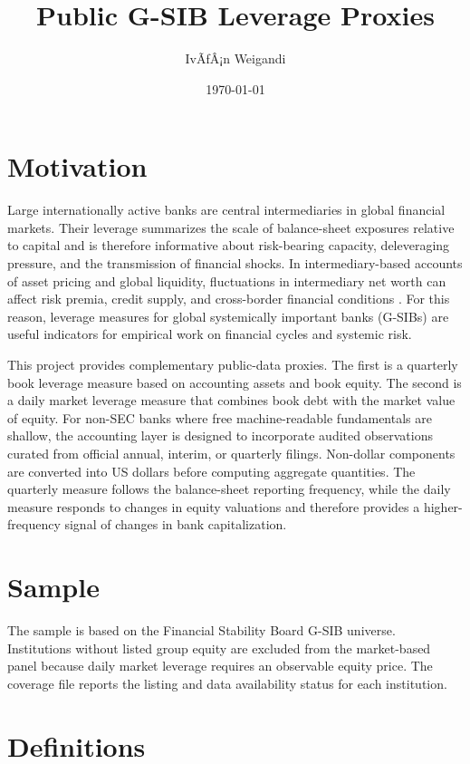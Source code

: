 \documentclass[11pt]{article}
\title{Public G-SIB Leverage Proxies}
\author{IvÃƒÂ¡n Weigandi}
\date{\today}
\begin{document}
\maketitle

\section{Motivation}

Large internationally active banks are central intermediaries in global financial markets. Their leverage summarizes the scale of balance-sheet exposures relative to capital and is therefore informative about risk-bearing capacity, deleveraging pressure, and the transmission of financial shocks. In intermediary-based accounts of asset pricing and global liquidity, fluctuations in intermediary net worth can affect risk premia, credit supply, and cross-border financial conditions \citep{adrianshin2010,hekrishnamurthy2013,brunnermeierpedersen2009}. For this reason, leverage measures for global systemically important banks (G-SIBs) are useful indicators for empirical work on financial cycles and systemic risk.

This project provides complementary public-data proxies. The first is a quarterly book leverage measure based on accounting assets and book equity. The second is a daily market leverage measure that combines book debt with the market value of equity. For non-SEC banks where free machine-readable fundamentals are shallow, the accounting layer is designed to incorporate audited observations curated from official annual, interim, or quarterly filings. Non-dollar components are converted into US dollars before computing aggregate quantities. The quarterly measure follows the balance-sheet reporting frequency, while the daily measure responds to changes in equity valuations and therefore provides a higher-frequency signal of changes in bank capitalization.

\section{Sample}

The sample is based on the Financial Stability Board G-SIB universe. Institutions without listed group equity are excluded from the market-based panel because daily market leverage requires an observable equity price. The coverage file reports the listing and data availability status for each institution.

\section{Definitions}
\end{document}
